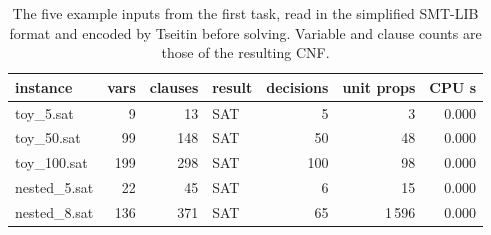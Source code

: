 \begin{table}[H]
\centering
\small
\begin{tabular}{lrrlrrr}
\toprule
instance & vars & clauses & result & decisions & unit props & CPU s \\
\midrule
toy\_5.sat & 9 & 13 & SAT & 5 & 3 & 0.000 \\
toy\_50.sat & 99 & 148 & SAT & 50 & 48 & 0.000 \\
toy\_100.sat & 199 & 298 & SAT & 100 & 98 & 0.000 \\
nested\_5.sat & 22 & 45 & SAT & 6 & 15 & 0.000 \\
nested\_8.sat & 136 & 371 & SAT & 65 & 1\,596 & 0.000 \\
\bottomrule
\end{tabular}
\caption{The five example inputs from the first task, read in the simplified SMT-LIB format and encoded by Tseitin before solving. Variable and clause counts are those of the resulting CNF.}
\label{tab:examples}
\end{table}
